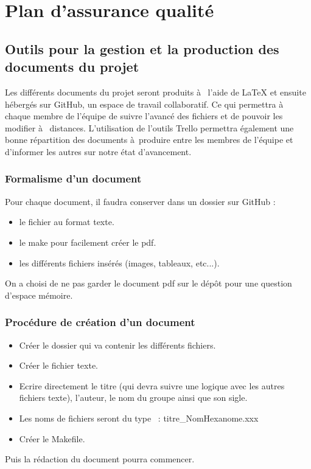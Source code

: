 \chapter{Plan d'assurance qualité}

\section{Outils pour la gestion et la production des documents du projet}

    Les différents documents du projet seront produits à  l'aide de LaTeX et ensuite hébergés sur GitHub, un espace de travail collaboratif. Ce qui permettra à  chaque membre de l'équipe de suivre l'avancé des fichiers et de pouvoir les modifier à  distances. 
    L'utilisation de l'outils Trello permettra également une bonne répartition des documents à produire entre les membres de l'équipe et d'informer les autres sur notre état d'avancement.

\subsection{Formalisme d'un document}

Pour chaque document, il faudra conserver dans un dossier sur GitHub :
\begin{itemize}
    \item le fichier au format texte.
    \item le make pour facilement créer le pdf.
    \item les différents fichiers insérés (images, tableaux, etc...).
\end{itemize}
On a choisi de ne pas garder le document pdf sur le dépôt pour une question d'espace mémoire.
\subsection{Procédure de création d'un document}

\begin{itemize}
    \item Créer le dossier qui va contenir les différents fichiers.
    \item Créer le fichier texte.
    \item Ecrire directement le titre (qui devra suivre une logique avec les autres fichiers texte), l'auteur, le nom du groupe ainsi que son sigle.
    \item Les noms de fichiers seront du type  : titre_NomHexanome.xxx
   \item Créer le Makefile.
\end{itemize}
Puis la rédaction du document pourra commencer.

